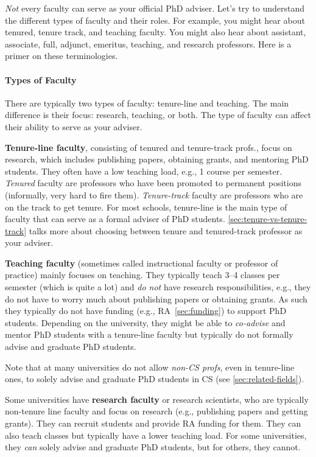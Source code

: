 \documentclass[oneside,11pt,dvipsnames]{book}
\begin{document}
\emph{Not} every faculty can serve as your official PhD adviser. Let's try to understand the different types of faculty and their roles. For example, you might hear about tenured,  tenure track, and teaching faculty.  You might also hear about assistant, associate, full, adjunct, emeritus, teaching, and research professors. Here is a primer on these terminologies.

\paragraph{Types of Faculty} There are typically two types of faculty: tenure-line and teaching.  The main difference is their focus: research, teaching, or both.  The type of faculty can affect their ability to serve as your adviser.

\textbf{Tenure-line faculty}, consisting of tenured and tenure-track profs., focus on research, which includes publishing papers, obtaining grants, and mentoring PhD students.  They often have a low teaching load, e.g., 1 course per semester. \emph{Tenured} faculty are professors who have been promoted to permanent positions (informally, very hard to fire them).  \emph{Tenure-track} faculty are professors who are on the track to get tenure.  For most schools, tenure-line is the main type of faculty that can serve as a formal adviser of PhD students. \autoref{sec:tenure-vs-tenure-track} talks more about choosing between tenure and tenured-track professor as your adviser.

\textbf{Teaching faculty} (sometimes called instructional faculty or professor of practice) mainly focuses on teaching. They typically teach 3--4 classes per semester (which is quite a lot) and \emph{do not} have research responsibilities, e.g., they do not have to worry much about publishing papers or obtaining grants. As such they typically do not have funding (e.g., RA~\autoref{sec:funding}) to support PhD students.
Depending on the university, they might be able to \emph{co-advise} and mentor PhD students with a tenure-line faculty but typically do not formally advise and graduate PhD students.

Note that at many universities do not allow \emph{non-CS profs}, even in tenure-line ones, to solely advise and graduate PhD students in CS (see \autoref{sec:related-fields}). 

Some universities have \textbf{research faculty} or research scientists, who are typically non-tenure line faculty and focus on research (e.g., publishing papers and getting grants). 
They can recruit students and provide RA funding for them. 
They can also teach classes but typically have a lower teaching load.
For some universities, they \emph{can} solely advise and graduate PhD students, but for others, they cannot. 
\end{document}
